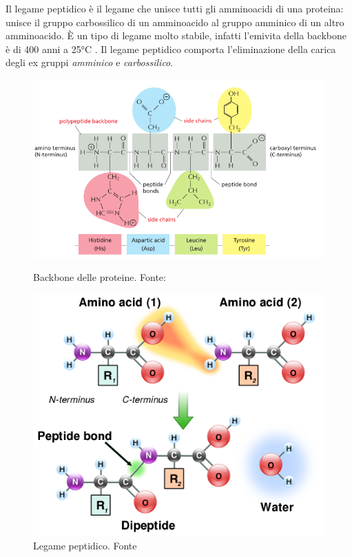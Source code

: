 \par Il legame peptidico è il legame che unisce tutti gli amminoacidi di una proteina: unisce il gruppo carbossilico di un amminoacido al gruppo amminico di un altro amminoacido. È un tipo di legame molto stabile, infatti l'emivita della backbone è di 400 anni a 25°C \supercite{alberts2018essential}. Il legame peptidico comporta l'eliminazione della carica degli ex gruppi \textit{amminico} e \textit{carbossilico}. 

\begin{figure}[!htb]
	\centering
	\includegraphics[scale=0.43]{images/protein-backbone.png}
	\caption{Backbone delle proteine. Fonte: \cite{alberts2018essential}}
	\label{fig:backbone}
	\endminipage\hfill
	\centering
	\includegraphics[scale=0.18]{images/peptide-bond.png}
	\caption{Legame peptidico. Fonte \cite{peptideBondWiki}}
	\label{fig:legame-peptidico}
	\endminipage\hfill
\end{figure}

